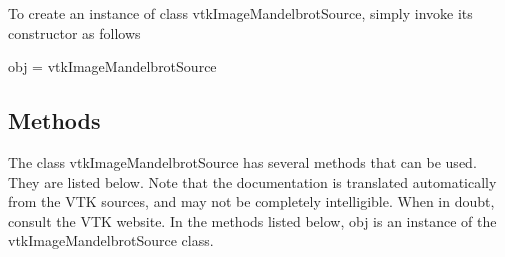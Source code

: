 To create an instance of class vtk\-Image\-Mandelbrot\-Source, simply invoke its constructor as follows \begin{DoxyVerb}  obj = vtkImageMandelbrotSource
\end{DoxyVerb}
 \hypertarget{vtkwidgets_vtkxyplotwidget_Methods}{}\subsection{Methods}\label{vtkwidgets_vtkxyplotwidget_Methods}
The class vtk\-Image\-Mandelbrot\-Source has several methods that can be used. They are listed below. Note that the documentation is translated automatically from the V\-T\-K sources, and may not be completely intelligible. When in doubt, consult the V\-T\-K website. In the methods listed below, {\ttfamily obj} is an instance of the vtk\-Image\-Mandelbrot\-Source class. 
